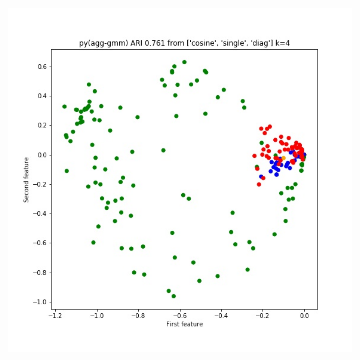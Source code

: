 \documentclass{article}
\begin{document}
\begin{figure}[h!]
\begin{subfigure}[b]{0.3\linewidth}
\end{subfigure} 
\begin{subfigure}[b]{0.3\linewidth}
  \includegraphics[width=\linewidth]{python_ari_k4.jpg}
\end{subfigure} 


\end{figure}
\end{document}
